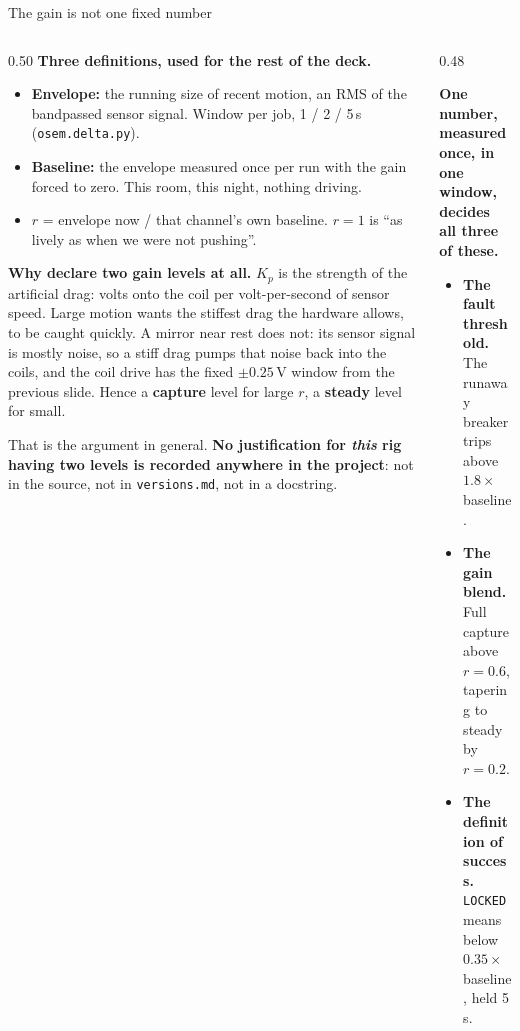 \documentclass[aspectratio=169]{beamer}
\begin{document}
\begin{frame}{The gain is not one fixed number}
  \scriptsize
  \begin{columns}[T]
    \begin{column}{0.50\textwidth}
      \textbf{Three definitions, used for the rest of the deck.}
      \begin{itemize}\setlength{\itemsep}{1pt}
        \item \textbf{Envelope:} the running size of recent motion, an RMS of
              the bandpassed sensor signal. Window per job, 1 / 2 / 5\,s
              (\texttt{osem.delta.py}).
        \item \textbf{Baseline:} the envelope measured once per run with the
              gain forced to zero. This room, this night, nothing driving.
        \item $r$ = envelope now / that channel's own baseline. $r = 1$ is
              ``as lively as when we were not pushing''.
      \end{itemize}

      \vspace{1mm}
      \textbf{Why declare two gain levels at all.} $K_p$ is the strength of the
      artificial drag: volts onto the coil per volt-per-second of sensor speed.
      Large motion wants the stiffest drag the hardware allows, to be caught
      quickly. A mirror near rest does not: its sensor signal is mostly noise, so
      a stiff drag pumps that noise back into the coils, and the coil drive has
      the fixed $\pm 0.25$\,V window from the previous slide. Hence a
      \textbf{capture} level for large $r$, a \textbf{steady} level for small.

      \vspace{1mm}
      That is the argument in general. \textbf{No justification for \emph{this}
      rig having two levels is recorded anywhere in the project}: not in the
      source, not in \texttt{versions.md}, not in a docstring.
    \end{column}
    \begin{column}{0.48\textwidth}
      \raggedright
      \alert{\textbf{One number, measured once, in one window, decides all three
      of these.}}
      {\footnotesize
      \begin{itemize}\setlength{\itemsep}{1.5pt}
        \item \textbf{The fault threshold.} The runaway breaker trips above
              $1.8 \times$ baseline.
        \item \textbf{The gain blend.} Full capture above $r = 0.6$, tapering to
              steady by $r = 0.2$.
        \item \textbf{The definition of success.} \texttt{LOCKED} means below
              $0.35 \times$ baseline, held 5\,s.
      \end{itemize}}


\end{column}
\end{columns}
\end{frame}
\end{document}
